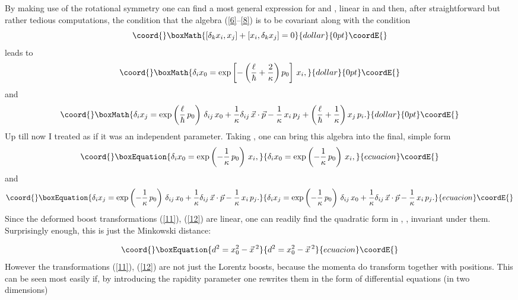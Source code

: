 \documentclass[a4paper,a4paper]{article}
\begin{document}
By making use of the rotational symmetry one can find a most general expression for \coordHE{} and \coordHE{}, linear in \coordHE{} and then, after straightforward but rather tedious computations, the condition that the algebra (\ref{6}--\ref{8}) is to be covariant  along with the condition
$$\coord{}\boxMath{[\delta_k x_i, x_j] + [ x_i, \delta_k x_j]=0
}{dollar}{0pt}\coordE{}$$
leads to 
$$\coord{}\boxMath{
\delta_i x_0 = \exp\left[-\left(\frac\ell\hbar + \frac2\kappa \right)p_0 \right] \,  x_i  , 
}{dollar}{0pt}\coordE{}$$
and
$$\coord{}\boxMath{
 \delta_i x_j = \exp\left(\frac\ell\hbar\, p_0 \right)\, \delta_{ij}\, x_0  + \frac1\kappa \delta_{ij}\,\vec{x}\cdot \vec{p} - \frac1\kappa\, x_i \, p_j + \left(\frac\ell\hbar+ \frac1\kappa\right) x_j\, p_i. 
}{dollar}{0pt}\coordE{}$$
Up till now I treated \myHighlight{$\ell$}\coordHE{} as if it was an independent parameter. Taking  \myHighlight{$\ell   = -\frac\hbar\kappa$}\coordHE{}, one can bring this algebra into the final, simple form
\begin{equation}\coord{}\boxEquation{\label{11}
\delta_i x_0 = \exp\left(- \frac1\kappa \,p_0 \right) \,  x_i  , 
}{\delta_i x_0 = \exp\left(- \frac1\kappa \,p_0 \right) \,  x_i  , 
}{ecuacion}\coordE{}\end{equation}
and
\begin{equation}\coord{}\boxEquation{\label{12}
 \delta_i x_j = \exp\left(- \frac1\kappa \,p_0 \right)\, \delta_{ij}\, x_0  + \frac1\kappa \delta_{ij}\,\vec{x}\cdot \vec{p} - \frac1\kappa\, x_i \, p_j . 
}{\delta_i x_j = \exp\left(- \frac1\kappa \,p_0 \right)\, \delta_{ij}\, x_0  + \frac1\kappa \delta_{ij}\,\vec{x}\cdot \vec{p} - \frac1\kappa\, x_i \, p_j . 
}{ecuacion}\coordE{}\end{equation}
Since the deformed boost transformations (\ref{11}), (\ref{12}) are linear, one can readily find the quadratic form in \coordHE{}, \coordHE{}, invariant under them. Surprisingly enough, this  is just the Minkowski distance:

\begin{equation}\coord{}\boxEquation{\label{13}
 d^2= x_0^2 - \vec{x} \,{}^2
}{d^2= x_0^2 - \vec{x} \,{}^2
}{ecuacion}\coordE{}\end{equation}
However the transformations (\ref{11}), (\ref{12}) are not just the Lorentz boosts, because the momenta  do transform together with positions. This can be seen most easily if,   by introducing the rapidity parameter \myHighlight{$\xi$}\coordHE{} one rewrites them in the form of differential equations (in two dimensions) 
\end{document}
